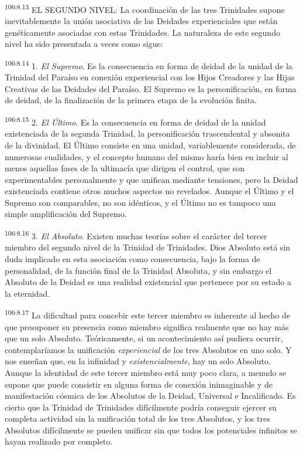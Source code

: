 \par
\textsuperscript{106:8.13} EL SEGUNDO NIVEL: La coordinación de las tres Trinidades supone inevitablemente la unión asociativa de las Deidades experienciales que están genéticamente asociadas con estas Trinidades. La naturaleza de este segundo nivel ha sido presentada a veces como sigue:

\par
\textsuperscript{106:8.14} 1. \textit{El Supremo}. Es la consecuencia en forma de deidad de la unidad de la Trinidad del Paraíso en conexión experiencial con los Hijos Creadores y las Hijas Creativas de las Deidades del Paraíso. El Supremo es la personificación, en forma de deidad, de la finalización de la primera etapa de la evolución finita.

\par
\textsuperscript{106:8.15} 2. \textit{El Último}. Es la consecuencia en forma de deidad de la unidad existenciada de la segunda Trinidad, la personificación trascendental y absonita de la divinidad. El Último consiste en una unidad, variablemente considerada, de numerosas cualidades, y el concepto humano del mismo haría bien en incluir al menos aquellas fases de la ultimacía que dirigen el control, que son experimentables personalmente y que unifican mediante tensiones, pero la Deidad existenciada contiene otros muchos aspectos no revelados. Aunque el Último y el Supremo son comparables, no son idénticos, y el Último no es tampoco una simple amplificación del Supremo.

\par
\textsuperscript{106:8.16} 3. \textit{El Absoluto}. Existen muchas teorías sobre el carácter del tercer miembro del segundo nivel de la Trinidad de Trinidades. Dios Absoluto está sin duda implicado en esta asociación como consecuencia, bajo la forma de personalidad, de la función final de la Trinidad Absoluta, y sin embargo el Absoluto de la Deidad es una realidad existencial que pertenece por su estado a la eternidad.

\par
\textsuperscript{106:8.17} La dificultad para concebir este tercer miembro es inherente al hecho de que presuponer su presencia como miembro significa realmente que no hay más que un solo Absoluto. Teóricamente, si un acontecimiento así pudiera ocurrir, contemplaríamos la unificación \textit{experiencial} de los tres Absolutos en uno solo. Y nos enseñan que, en la infinidad y \textit{existencialmente}, hay un solo Absoluto. Aunque la identidad de este tercer miembro está muy poco clara, a menudo se supone que puede consistir en alguna forma de conexión inimaginable y de manifestación cósmica de los Absolutos de la Deidad, Universal e Incalificado. Es cierto que la Trinidad de Trinidades difícilmente podría conseguir ejercer su completa actividad sin la unificación total de los tres Absolutos, y los tres Absolutos difícilmente se pueden unificar sin que todos los potenciales infinitos se hayan realizado por completo.

